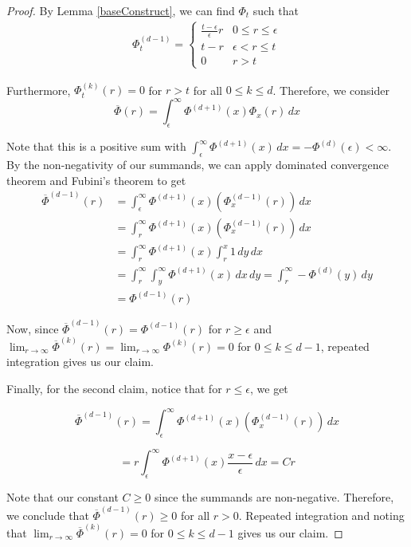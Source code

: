 \begin{proof}
By Lemma \ref{baseConstruct}, we can find $\Phi_t$ such that
\begin{align*}
\Phi_t^{(d-1)} = \begin{cases}
\frac{t-\epsilon}{\epsilon } r & 0 \leq r \leq \epsilon \\
t - r & \epsilon < r \leq t \\
0 & r > t
\end{cases}
\end{align*}

Furthermore, $\Phi_t^{(k)}(r) = 0$ for $r > t$ for all $0 \leq k \leq d$.
Therefore, we consider 
%
\[\overline{\Phi}(r) = \int_{\epsilon}^\infty \Phi^{(d+1)}(x) \Phi_x(r) \, dx\] 

Note that this is a positive sum with $\int_{\epsilon}^\infty \Phi^{(d+1)}(x) \, dx = -\Phi^{(d)}(\epsilon) < \infty$. By the non-negativity of our summands, we can apply dominated convergence theorem and Fubini's theorem to get
\begin{align*}
\overline{\Phi}^{(d-1)}(r) & = \int_{\epsilon}^\infty  \Phi^{(d+1)}(x) (\Phi_x^{(d-1)}(r)) \, dx \\
& = \int_{r}^\infty  \Phi^{(d+1)}(x) (\Phi_x^{(d-1)}(r)) \, dx \\
& = \int_r^\infty \Phi^{(d+1)}(x) \int_r^x 1 \, dy \,dx  \\
& = \int_r^\infty \int_y^\infty \Phi^{(d+1)}(x) \, dx \, dy = \int_r^\infty  -\Phi^{(d)}(y) \, dy \\
& = \Phi^{(d-1)}(r)
\end{align*}

Now, since $\overline{\Phi}^{(d-1)}(r) = \Phi^{(d-1)}(r)$ for $r\geq \epsilon$ and $\lim_{r\to\infty} \overline{\Phi}^{(k)}(r) = \lim_{r\to\infty} {\Phi}^{(k)}(r) = 0$ for $0 \leq k \leq d-1$, repeated integration gives us our claim. 

Finally, for the second claim, notice that for $r \leq \epsilon$, we get

\[\overline{\Phi}^{(d-1)}(r) = \int_{\epsilon}^\infty  \Phi^{(d+1)}(x) (\Phi_x^{(d-1)}(r)) \, dx\] 

\[ =  r \int_\epsilon^\infty \Phi^{(d+1)}(x) \frac{x - \epsilon}{\epsilon} \, dx = Cr  \]

Note that our constant $C \geq 0$ since the summands are non-negative. Therefore, we conclude that $\overline{\Phi}^{(d-1)}(r) \geq 0$ for all $r > 0$. Repeated integration and noting that $\lim_{r\to\infty} \overline{\Phi}^{(k)}(r) = 0$ for $0 \leq k \leq d-1$ gives us our claim.


\end{proof}
